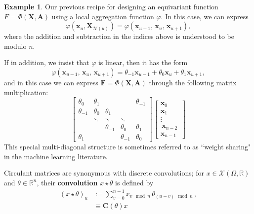 \documentclass[12pt]{article}
\numberwithin{equation}{section}
\theoremstyle{definition}
\newtheorem{eg}{Example}
\newcommand{		\R		}	{	\mathbb{R}				}
\newcommand{		\cX		}	{	\mathcal{X}				}
\newcommand{		\eq		}[1]	{	\begin{align*}#1\end{align*}	}%
\newcommand{		\B		}	{\textbf					} %
\newcommand{		\Oh		}	{	\Omega					}
\newcommand{		\1		}	{	\bm{1}					}%
\begin{document}
\vspace{5mm}
\begin{mdframed}
\begin{eg}
Our previous recipe for designing an equivariant function $F= \Phi( \bm{X}, \bm{A})$ using a local aggregation function $\varphi$. In this case, we can express
$$
\varphi ( \mathbf{x}_u, \mathbf{X}_{\mathcal{N}(u)} ) = \varphi( \mathbf{x}_{u-1}, \, \mathbf{x}_u, \, \mathbf{x}_{u+1} ),
$$
where the addition and subtraction in the indices above is understood to be modulo $n$. 

 If in addition, we insist that $\varphi$ is linear, then it has the form 
$$
 \varphi( \mathbf{x}_{u-1}, \, \mathbf{x}_u, \, \mathbf{x}_{u+1} ) = \theta_{-1} \mathbf{x}_{u-1} + \theta_0 \mathbf{x}_u + \theta_1 \mathbf{x}_{u+1},
$$
and in this case we can express $\mathbf{F} = \Phi (\mathbf{X}, \mathbf{A} )$ through the following matrix multiplication:
$$
\left[
\begin{matrix}
\theta_0 & \theta_1 & \text{ } & \text{ } & \theta_{-1} \\
\theta_{-1} & \theta_0 & \theta_1 & \text{ } &   \text{ } \\
\text{} & \ddots & \ddots & \ddots & \text{ } \\
\text{ } & \text{ } & \theta_{-1} & \theta_0 & \theta_1 \\
\theta_1 & \text{ } & \text{ } & \theta_{-1} & \theta_0 
\end{matrix} 
\right]
\left[
\begin{matrix}
\mathbf{x}_0 \\
\mathbf{x}_1 \\
\vdots \\
\,\mathbf{x}_{n-2} \, \\
\mathbf{x}_{n-1}  
\end{matrix}
\right]
$$
This special multi-diagonal structure is sometimes referred to as ``weight sharing" in the machine learning literature. 
\end{eg}
\end{mdframed}

\vspace{5mm}

Circulant matrices are synonymous with discrete convolutions; for $x \in \cX(\Oh,\R)$ and $\theta \in \R^n$, their \B{convolution} $x \star \theta$ is defined by 
\eq{
( x \star \theta )_u &:= \sum_{v = 0}^{n-1} x_{v \mod n}\, \theta_{ (u-v) \mod n}  \, ,\\
&\equiv \bm{C}(\theta) x 
}
\end{document}
